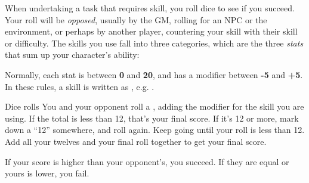 
When undertaking a task that requires skill, you roll dice to see if you succeed. Your roll will be \emph{opposed}, usually by the GM, rolling for an NPC or the environment, or perhaps by another player, countering your skill with their skill or difficulty. The skills you use fall into three categories, which are the three \emph{stats} that sum up your character's ability:



Normally, each stat is between \textbf{0} and \textbf{20}, and has a modifier between \textbf{-5} and \textbf{+5}. In these rules, a skill is written as , e.g. .

\begin{abstractsection}{Dice rolls}
You and your opponent roll a , adding the modifier for the skill you are using. If the total is less than 12, that's your final score. If it's 12 or more, mark down a ``12'' somewhere, and roll again. Keep going until your roll is less than 12. Add all your twelves and your final roll together to get your final score.

If your score is higher than your opponent's, you succeed. If they are equal or yours is lower, you fail.
\end{abstractsection}
